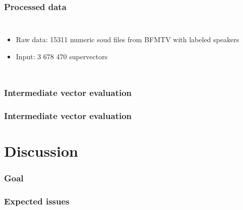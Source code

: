 \documentclass[11pt,english]{beamer}
\begin{document}
\begin{frame}
  \frametitle{Processed data}

  \begin{columns}
    \begin{itemize}
    \item Raw data: 15311 numeric soud files from BFMTV with labeled speakers
    \item Input: 3 678 470 supervectors

    \end{itemize}

  \end{columns}
  
\end{frame}

\begin{frame}
  \frametitle{Intermediate vector evaluation}
  
\end{frame}

\begin{frame}
  \frametitle{Intermediate vector evaluation}
  
\end{frame}

\section{Discussion}

\begin{frame}
  \frametitle{Goal}
  
\end{frame}

\begin{frame}
  \frametitle{Expected issues}
  
\end{frame}
\end{document}
